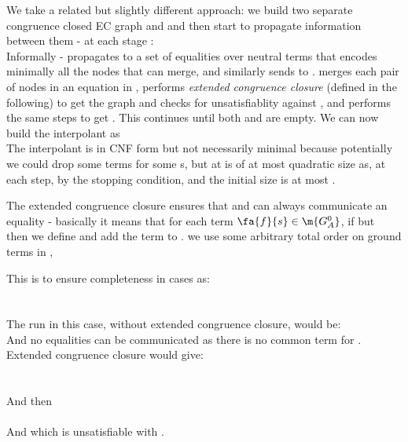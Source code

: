 We take a related but slightly different approach: we build two separate congruence closed EC graph  and  and then start to propagate information between them - at each stage  :\\
Informally -  propagates to  a set of equalities  over neutral terms that encodes minimally all the nodes that  can merge, and similarly  sends to  . 
 merges each pair of nodes in an equation in , performs \emph{extended congruence closure} (defined in the following) to get the graph  and checks for unsatisfiablity against , and  performs the same steps to get .
This continues until both  and  are empty. 
We can now build the interpolant as \\
The interpolant is in CNF form but not necessarily minimal because potentially we could drop some  terms for some s, but at is of at most quadratic size as, at each step,  by the stopping condition, and the initial size is at most .

The extended congruence closure ensures that  and  can always communicate an equality - 
basically it means that for each term $\fa{f}{s} \in \m{G_A^0}$, 
if 
 but \\
then we define  and add the term 
 to .
we use some arbitrary total order on ground terms in ,

This is to ensure completeness in cases as:\\
 \\
 \\
The run in this case, without extended congruence closure, would be:\\
And no equalities can be communicated as there is no common term for .\\
Extended congruence closure would give:\\
 \\
 \\
And then 
 \\
 \\
And 
 which is unsatisfiable with .

